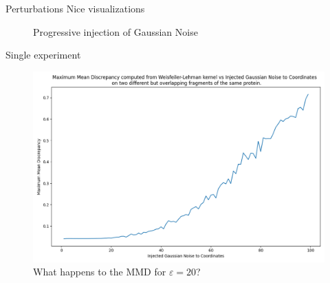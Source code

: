 \documentclass[aspectratio=169, 10pt, dvipsnames, handout]{beamer}
\begin{document}
\begin{frame}[fragile]{Perturbations}
  Nice visualizations
  \begin{figure}%
    \centering
    \qquad
    \qquad
    \caption{Progressive injection of Gaussian Noise}%
  \end{figure}
\end{frame}


\begin{frame}[fragile]{Single experiment}
  \begin{figure}%
    \centering
    \includegraphics[width=.7\textwidth]{./figures/plot_experiment.png}
    \caption{What happens to the MMD for $\varepsilon=20$?}%
  \end{figure}
\end{frame}
\end{document}

